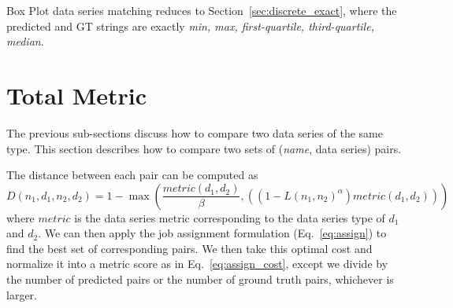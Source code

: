 \documentclass[a4paper,11pt]{scrartcl}
\begin{document}
Box Plot data series matching reduces to Section~\ref{sec:discrete_exact}, where the predicted and GT strings are exactly \emph{min, max, first-quartile, third-quartile, median}.

\section{Total Metric}

The previous sub-sections discuss how to compare two data series of the same type.
This section describes how to compare two sets of (\emph{name}, data series) pairs.

The distance between each pair can be computed as
\begin{equation}
D(n_1, d_1, n_2, d_2) = 1 - \max(\frac{metric(d_1, d_2)}{\beta}, ((1 - L(n_1, n_2)^\alpha)metric(d_1, d_2)))
\end{equation}
where $metric$ is the data series metric corresponding to the data series type of $d_1$ and $d_2$.
We can then apply the job assignment formulation (Eq.~\ref{eq:assign}) to find the best set of corresponding pairs.
We then take this optimal cost and normalize it into a metric score as in Eq.~\ref{eq:assign_cost}, except we divide by the number of predicted pairs or the number of ground truth pairs, whichever is larger.
\end{document}
